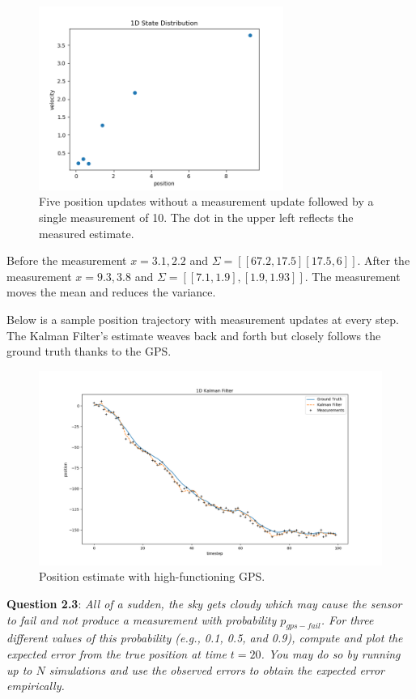 \documentclass{article}
\begin{document}
\begin{figure}[h]
    \includegraphics[width=8cm]{first_measure.png}
    \centering
    \caption{Five position updates without a measurement update followed by a single measurement of 10. The dot in the upper left reflects the measured estimate.}
\end{figure}

Before the measurement $x = {3.1, 2.2}$ and $\Sigma = [[67.2, 17.5] [17.5, 6]]$. After the measurement $x = {9.3, 3.8}$ and $\Sigma = [[7.1, 1.9],[1.9, 1.93]]$. The measurement moves the mean and reduces the variance. 

Below is a sample position trajectory with measurement updates at every step. The Kalman Filter's estimate weaves back and forth but closely follows the ground truth thanks to the GPS. 

\begin{figure}[h]
    \includegraphics[width=12cm]{perfect_measurement.png}
    \centering
    \caption{Position estimate with high-functioning GPS.}
\end{figure} 

{\bf Question 2.3}: \textit{All of a sudden, the sky gets cloudy which may cause the sensor to fail and not produce a measurement with probability $p_{gps-fail}$. For three different values of this probability (e.g., 0.1, 0.5, and 0.9), compute and plot the expected error from the true position at time $t = 20$. You may do so by running up to $N$ simulations and use the observed errors to obtain the expected error empirically.}
\end{document}
